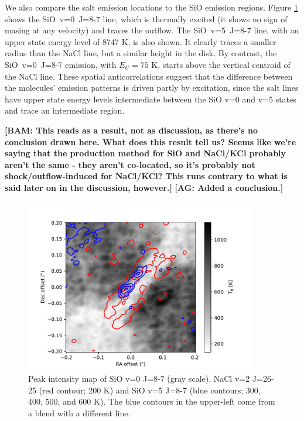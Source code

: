 \documentclass[twocolumn]{aastex62}
\newcommand{\bam}[1]{\textcolor{green!65!black}{\textbf{[BAM: #1]}}}
\newcommand{\ag}[1]{\textcolor{red!65!black}{\textbf{[AG: #1]}}}
\begin{document}
We also compare the salt emission locations to the SiO emission regions.
Figure \ref{fig:sioonnacl} shows the \mbox{SiO v=0 J=8-7} line, which is
thermally excited (it shows no sign of masing at any velocity) and traces the
outflow.  The \mbox{SiO v=5 J=8-7} line, with an upper state energy level of
8747 K, is also shown.  It clearly traces a smaller radius than the NaCl line,
but a similar height in the disk.  By contrast, the \mbox{SiO v=0 J=8-7}
emission, with $E_U=75$ K, starts above the vertical centroid of the NaCl line.
These spatial anticorrelations suggest that the difference between the
molecules' emission patterns is driven partly by excitation, since the salt
lines have upper state energy levels intermediate between the SiO v=0 and v=5
states and trace an intermediate region.

\bam{This reads
as a result, not as discussion, as there's no conclusion drawn here.  What does
this result tell us?  Seems like we're saying that the production method for
SiO and NaCl/KCl probably aren't the same - they aren't co-located, so it's
probably not shock/outflow-induced for NaCl/KCl?  This runs contrary to what is
said later on in the discussion, however.}
\ag{Added a conclusion.}


\begin{figure}[!htp]
\includegraphics[scale=1,width=4in]{figures/SiO_8-7_on_NaClv=2_26-25.pdf}
\caption{Peak intensity map of SiO v=0 J=8-7 (gray scale), NaCl v=2 J=26-25
(red contour; 200 K) and {SiO v=5 J=8-7} (blue contours; 300, 400, 500, and 600
K).  The blue contours in the upper-left come from a blend with a different
line.
}
\label{fig:sioonnacl}
\end{figure}


\end{document}
